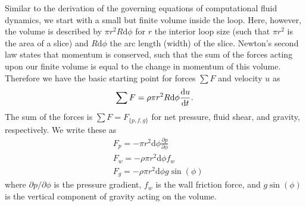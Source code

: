 \documentclass[10pt,letterpaper]{article}
\newcommand{\pdiff}[2]{\frac{\partial #1}{\partial #2}}
\newcommand{\diff}[2]{\frac{{\rm d}#1}{{\rm d}#2}}
\begin{document}
Similar to the derivation of the governing equations of computational fluid dynamics, we start with a small but finite volume inside the loop.
Here, however, the volume is described by $\pi r^2 R \text{d} \phi$ for $r$ the interior loop size (such that $\pi r^2$ is the area of a slice) and $R\text{d}\phi$ the arc length (width) of the slice.
Newton's second law states that momentum is conserved, such that the sum of the forces acting upon our finite volume is equal to the change in momentum of this volume.
Therefore we have the basic starting point for forces $\sum F$ and velocity $u$ as
\begin{equation} \sum F = \rho \pi r^2 R \text{d}\phi \diff{u}{t} .\end{equation}
The sum of the forces is $\sum F = F_{\{p,f,g\}}$ for net pressure, fluid shear, and gravity, respectively.
We write these as
\begin{align} & F_p = -\pi r^2 \text{d} \phi \pdiff{p}{\phi}\\
& F_w = -\rho \pi r^2 \text{d} \phi f_w\\
& F_g = -\rho \pi r^2 \text{d} \phi g \sin (\phi)\end{align}
where $\partial p /\partial \phi$ is the pressure gradient, $f_w$ is the wall friction force, and $g \sin (\phi)$ is the vertical component of gravity acting on the volume.
\end{document}
